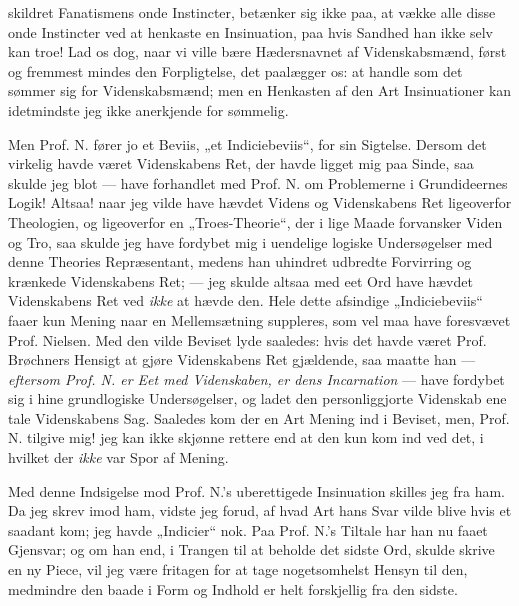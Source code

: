 \documentclass[12pt,a4paper]{book}
\newcommand{\opage}[1]{\marginnote{\footnotesize\textit{[#1]}}}
\begin{document}
skildret Fanatismens onde Instincter, betænker sig ikke paa, at vække alle disse
onde Instincter ved at henkaste en Insinuation, paa hvis Sandhed han ikke selv
kan troe! Lad os dog, naar vi ville bære Hædersnavnet af Videnskabsmænd, først og
fremmest mindes den Forpligtelse, det paalægger os: at handle som det sømmer sig
for Videnskabsmænd; men en Henkasten af den Art Insinuationer kan idetmindste
jeg ikke anerkjende for sømmelig.

Men Prof. N. fører jo et Beviis, „et Indiciebeviis“, for sin Sigtelse. Dersom det
virkelig havde været Videnskabens Ret, der havde ligget mig paa Sinde, saa skulde
jeg blot --- have forhandlet med Prof. N. om Problemerne i Grundideernes Logik!
Altsaa! naar jeg vilde have hævdet Videns og Videnskabens Ret ligeoverfor
Theologien, og ligeoverfor en „Troes-Theorie“, der i lige Maade forvansker Viden
og Tro, saa skulde jeg have fordybet mig i uendelige logiske Undersøgelser med
denne Theories Repræsentant, medens han uhindret udbredte Forvirring og krænkede
Videnskabens Ret; --- jeg skulde altsaa med eet Ord have hævdet Videnskabens Ret
ved \emph{ikke} at hævde den. Hele dette afsindige „Indiciebeviis“ faaer kun
Mening naar en Mellemsætning suppleres, som vel maa have foresvævet Prof.
Nielsen. Med den vilde Beviset lyde saaledes: hvis det havde været Prof.
Brøchners Hensigt at gjøre Videnskabens Ret gjældende, saa maatte han ---
\emph{eftersom Prof. N. er Eet med Videnskaben, er dens Incarnation} --- have
fordybet sig i hine grundlogiske Undersøgelser, og ladet den personliggjorte
Videnskab
\opage{29} ene tale Videnskabens Sag. Saaledes kom der en Art Mening ind i Beviset, men,
Prof. N. tilgive mig! jeg kan ikke skjønne rettere end at den kun kom ind ved
det, i hvilket der \emph{ikke} var Spor af Mening.

Med denne Indsigelse mod Prof. N.'s uberettigede Insinuation skilles jeg fra ham.
Da jeg skrev imod ham, vidste jeg forud, af hvad Art hans Svar vilde blive hvis
et saadant kom; jeg havde „Indicier“ nok. Paa Prof. N.'s Tiltale har han nu
faaet Gjensvar; og om han end, i Trangen til at beholde det sidste Ord, skulde
skrive en ny Piece, vil jeg være fritagen for at tage nogetsomhelst Hensyn til
den, medmindre den baade i Form og Indhold er helt forskjellig fra den sidste.
\end{document}
